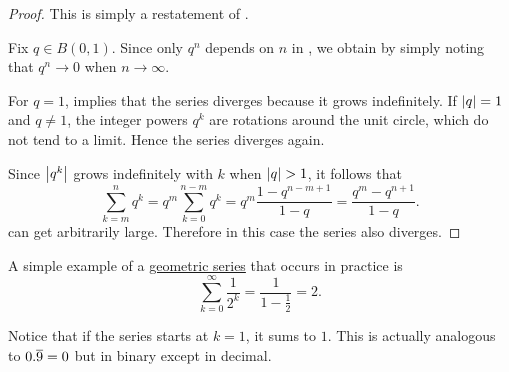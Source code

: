 \begin{proof}
   This is simply a restatement of .

   Fix \( q \in B(0, 1) \). Since only \( q^n \) depends on \( n \) in , we obtain  by simply noting that \( q^n \to 0 \) when \( n \to \infty \).

   For \( q = 1 \),  implies that the series diverges because it grows indefinitely. If \( \left\vert q \right\vert = 1 \) and \( q \neq 1 \), the integer powers \( q^k \) are rotations around the unit circle, which do not tend to a limit. Hence the series diverges again.

  Since \( \left\vert q^k \right\vert \) grows indefinitely with \( k \) when \( \left\vert q \right\vert > 1 \), it follows that
  \begin{equation*}\label{thm:geometric_progression/cauchy_partial_sum}
    \sum_{k=m}^n q^k
    =
    q^m \sum_{k=0}^{n-m} q^k
    =
    q^m \frac {1 - q^{n-m+1}} {1 - q}
    =
    \frac {q^m - q^{n+1}} {1 - q}.
  \end{equation*}
  can get arbitrarily large. Therefore in this case the series also diverges.
\end{proof}

\begin{example}\label{ex:series_of_reciprocal_powers_of_two}
  A simple example of a \hyperref[def:geometric_progression/series]{geometric series} that occurs in practice is
  \begin{equation}\label{ex:series_of_reciprocal_powers_of_two/series}
    \sum_{k=0}^\infty \frac 1 {2^k} = \frac 1 {1 - \frac 1 2} = 2.
  \end{equation}

  Notice that if the series starts at \( k = 1 \), it sums to \( 1 \). This is actually analogous to \( 0.\overline{9} = 0 \) but in binary except in decimal.
\end{example}

